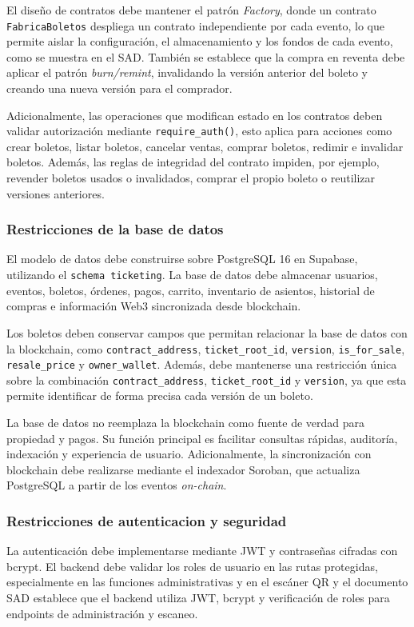 \documentclass[12pt,letterpaper]{article}
\begin{document}
El diseño de contratos debe mantener el patrón \textit{Factory}, donde un contrato
\texttt{FabricaBoletos} despliega un contrato independiente por cada evento, lo que
permite aislar la configuración, el almacenamiento y los fondos de cada evento, como
se muestra en el SAD. También se establece que la compra en reventa debe aplicar el
patrón \textit{burn/remint}, invalidando la versión anterior del boleto y creando
una nueva versión para el comprador.

Adicionalmente, las operaciones que modifican estado en los contratos deben validar
autorización mediante \texttt{require\_auth()}, esto aplica para acciones como crear
boletos, listar boletos, cancelar ventas, comprar boletos, redimir e invalidar
boletos. Además, las reglas de integridad del contrato impiden, por ejemplo, revender
boletos usados o invalidados, comprar el propio boleto o reutilizar versiones anteriores.

\subsubsection{Restricciones de la base de datos}
El modelo de datos debe construirse sobre PostgreSQL 16 en Supabase, utilizando
el \texttt{schema ticketing}. La base de datos debe almacenar usuarios, eventos,
boletos, órdenes, pagos, carrito, inventario de asientos, historial de compras e
información Web3 sincronizada desde blockchain.

Los boletos deben conservar campos que permitan relacionar la base de datos con
la blockchain, como \texttt{contract\_address}, \texttt{ticket\_root\_id},
\texttt{version}, \texttt{is\_for\_sale}, \texttt{resale\_price} y
\texttt{owner\_wallet}. Además, debe mantenerse una restricción única sobre la
combinación \texttt{contract\_address}, \texttt{ticket\_root\_id} y
\texttt{version}, ya que esta permite identificar de forma precisa cada versión
de un boleto.

La base de datos no reemplaza la blockchain como fuente de verdad para propiedad
y pagos. Su función principal es facilitar consultas rápidas, auditoría,
indexación y experiencia de usuario. Adicionalmente, la sincronización con
blockchain debe realizarse mediante el indexador Soroban, que actualiza
PostgreSQL a partir de los eventos \textit{on-chain}.

\subsubsection{Restricciones de autenticacion y seguridad}
La autenticación debe implementarse mediante JWT y contraseñas cifradas con bcrypt. El backend debe validar los roles de usuario en las rutas protegidas, especialmente en las funciones administrativas y en el escáner QR y el documento SAD establece que el backend utiliza JWT, bcrypt y verificación de roles para endpoints de administración y escaneo.
\end{document}
